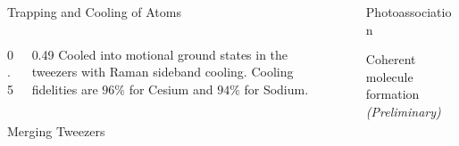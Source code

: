 \documentclass[final]{beamer}
\newlength{\sepwid}
\newlength{\coltwowid}
\newlength{\onecolwid}
\begin{document}
\begin{frame}[t]
\begin{columns}[t]
\begin{column}{\coltwowid}
\begin{block}{Trapping and Cooling of Atoms}
\begin{columns}[T]
\begin{column}{0.5\coltwowid}
\begin{center}
\begin{tikzpicture}
              \end{tikzpicture}
            \end{center}
          \end{column}
          \begin{column}{0.49\coltwowid}
            \vspace{1ex}
            Cooled into motional ground states in the tweezers with Raman sideband cooling.
            Cooling fidelities are $96\%$ for Cesium and $94\%$ for Sodium.
          \end{column}
        \end{columns}
      \end{block}
      \begin{block}{Merging Tweezers}
      \end{block}
    \end{column} %

    \begin{column}{\sepwid}\end{column} %

    \begin{column}{\onecolwid} %
      \begin{block}{Photoassociation}
      \end{block}

      \begin{block}{Coherent molecule formation \textit{\small (Preliminary)}}
      \end{block}

    \end{column} %

  \end{columns} %

\end{frame} %
\end{document}

